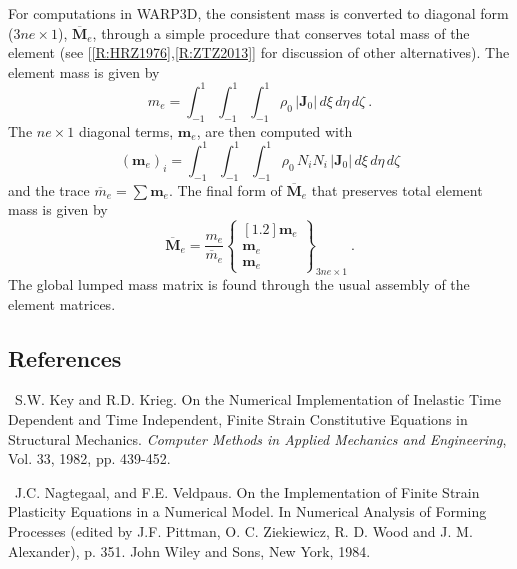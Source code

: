 \documentclass[11pt]{report}
\numberwithin{equation}{section}
\newcommand{\bmf } {\boldsymbol }  %
\newcommand{\ti}{\emph}
\newcounter{sectrefs}
\begin{document}
For computations in WARP3D, the consistent mass is converted to diagonal form ($3ne \times 1$), 
$\overline {\bmf{M}}_e$, through a simple procedure 
that conserves total mass of the element  (see  [\ref{R:HRZ1976},\ref{R:ZTZ2013}] for discussion of other alternatives).
The element mass is given by 
%
\begin{equation}\label{E:Me2}
m_e =   \int_{-1}^1 \int_{-1}^1 \int_{-1}^1\rho_0\, |\mathbf{J}_0|\, d \xi\, d\eta\, d\zeta~.
\end{equation}
%
The $ne \times 1$ diagonal terms, $\bmf{m}_e$,  are then computed with
%
\begin{equation}\label{E:Me3}
\left (\bmf{m}_e\right )_{i} =   \int_{-1}^1 \int_{-1}^1 \int_{-1}^1\rho_0\, 
N_i N_i \,|\mathbf{J}_0|\, d \xi\, d\eta\, d\zeta
\end{equation}
%
and the trace $\overline m_e= \sum \bmf{m}_e$.  The final form of $\overline {\bmf{M}}_e$ that
preserves total element mass is given by
%
\begin{equation}\label{E:Me3}
\overline {\bmf{M}}_e = \frac{m_e}{\overline m_e}
\begin{Bmatrix}[1.2]
\bmf{m}_e  \\  
\bmf{m}_e\\  
\bmf{m}_e\end{Bmatrix}_{3ne\times 1}~.
\end{equation}
The global  lumped mass matrix is found through the usual assembly of the element matrices.
\subsection {References}
\small

~S.W. Key and R.D. Krieg.
On the Numerical Implementation of Inelastic Time Dependent and Time Independent, 
Finite Strain Constitutive Equations in Structural Mechanics. \ti{Computer Methods in Applied Mechanics and
Engineering}, Vol. 33, 1982, pp. 439-452.

\medskip
{}~J.C. Nagtegaal, and F.E. Veldpaus.
On the Implementation of Finite Strain Plasticity Equations in a Numerical Model.
In Numerical Analysis of Forming Processes (edited by J.F. Pittman, O. C. Ziekiewicz, R. D. Wood 
and J. M. Alexander), p. 351. John Wiley and Sons, New York, 1984.
\end{document}
